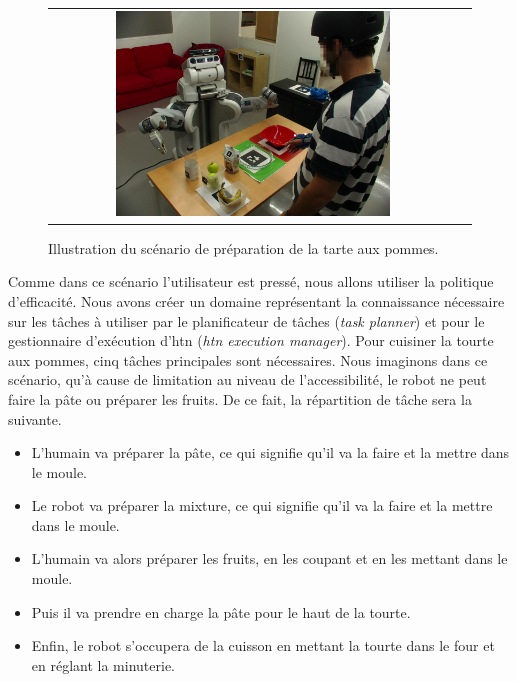 \documentclass[a4paper,11pt,twoside]{StyleThese}
\begin{document}
\begin{figure}[ht!]

 \centering
 \begin{tabular}{cc}
  \includegraphics[width=0.69\textwidth]{img/scenario.JPG}
 \end{tabular}
 \caption{Illustration du scénario de préparation de la tarte aux pommes.}
 \label{fig:scenarioPie}
 \end{figure}

Comme dans ce scénario l'utilisateur est pressé, nous allons utiliser la politique d'efficacité.
Nous avons créer un domaine représentant la connaissance nécessaire sur les tâches à utiliser par le planificateur de tâches (\textit{task planner}) et pour le gestionnaire d'exécution d'htn (\textit{htn execution manager}).
Pour cuisiner la tourte aux pommes, cinq tâches principales sont nécessaires. Nous imaginons dans ce scénario, qu'à cause de limitation au niveau de l'accessibilité, le robot ne peut faire la pâte ou préparer les fruits. De ce fait, la répartition de tâche sera la suivante.




\begin{itemize}
\item L'humain va préparer la pâte, ce qui signifie qu'il va la faire et la mettre dans le moule.
\item Le robot va préparer la mixture, ce qui signifie qu'il va la faire et la mettre dans le moule.
\item L'humain va alors préparer les fruits, en les coupant et en les mettant dans le moule.
\item Puis il va prendre en charge la pâte pour le haut de la tourte.
\item Enfin, le robot s'occupera de la cuisson en mettant la tourte dans le four et en réglant la minuterie.
\end{itemize} 
\end{document}

